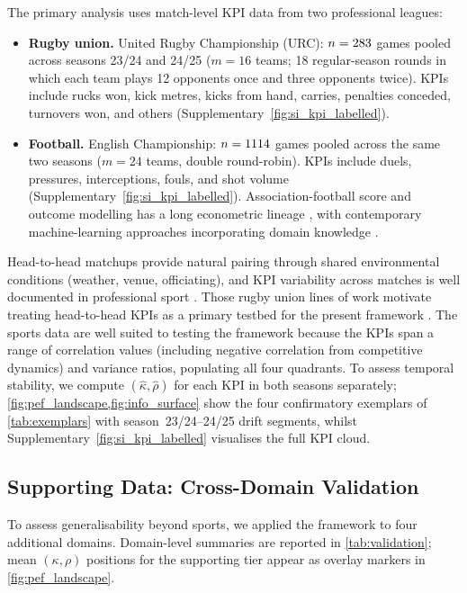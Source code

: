 The primary analysis uses match-level KPI data from two professional leagues:
\begin{itemize}
  \item \textbf{Rugby union.} United Rugby Championship ({URC}): $n=283$ games pooled across seasons 23/24 and 24/25 ($m=16$ teams; 18 regular-season rounds in which each team plays 12 opponents once and three opponents twice). KPIs include rucks won, kick metres, kicks from hand, carries, penalties conceded, turnovers won, and others (Supplementary~\cref{fig:si_kpi_labelled}).
  \item \textbf{Football.} English Championship: $n=1114$ games pooled across the same two seasons ($m=24$ teams, double round-robin). KPIs include duels, pressures, interceptions, fouls, and shot volume (Supplementary~\cref{fig:si_kpi_labelled}). Association-football score and outcome modelling has a long econometric lineage \parencite{dixon1997,boulier2003}, with contemporary machine-learning approaches incorporating domain knowledge \parencite{berrar2019}.
\end{itemize}
Head-to-head matchups provide natural pairing through shared environmental conditions (weather, venue, officiating), and KPI variability across matches is well documented in professional sport \parencite{malcata2014}. Those rugby union lines of work motivate treating head-to-head KPIs as a primary testbed for the present framework \parencite{bennett2019descriptive,bennett2021predicting,mosey2020,scott2023urc,scott2023womens}. The sports data are well suited to testing the framework because the KPIs span a range of correlation values (including negative correlation from competitive dynamics) and variance ratios, populating all four quadrants. To assess temporal stability, we compute $(\hat{\kappa},\hat{\rho})$ for each KPI in both seasons separately; \cref{fig:pef_landscape,fig:info_surface} show the four confirmatory exemplars of \cref{tab:exemplars} with season~23/24--24/25 drift segments, whilst Supplementary~\cref{fig:si_kpi_labelled} visualises the full KPI cloud.

\subsection{Supporting Data: Cross-Domain Validation}

To assess generalisability beyond sports, we applied the framework to four additional domains. Domain-level summaries are reported in \cref{tab:validation}; mean $(\kappa,\rho)$ positions for the supporting tier appear as overlay markers in \cref{fig:pef_landscape}.

